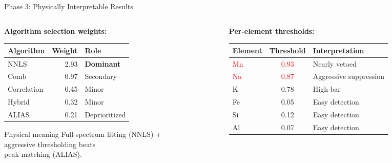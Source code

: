 \documentclass[aspectratio=169,12pt]{beamer}
\begin{document}
\begin{frame}{Phase 3: Physically Interpretable Results}
  \begin{columns}[T]
    \begin{column}{0.50\textwidth}
      \textbf{Algorithm selection weights:}
      {\small
      \begin{table}
        \begin{tabular}{@{}lrl@{}}
          \toprule
          Algorithm & Weight & Role \\
          \midrule
          \rowcolor{cbGreen!15}
          NNLS & \alert{2.93} & \textbf{Dominant} \\
          Comb & 0.97 & Secondary \\
          Correlation & 0.45 & Minor \\
          Hybrid & 0.32 & Minor \\
          ALIAS & 0.21 & Deprioritized \\
          \bottomrule
        \end{tabular}
      \end{table}
      }

      \vspace{0.3em}
      \begin{exampleblock}{Physical meaning}
        Full-spectrum fitting (NNLS) +\\
        aggressive thresholding beats\\
        peak-matching (ALIAS).
      \end{exampleblock}
    \end{column}
    \begin{column}{0.47\textwidth}
      \textbf{Per-element thresholds:}
      {\small
      \begin{table}
        \begin{tabular}{@{}lcl@{}}
          \toprule
          Element & Threshold & Interpretation \\
          \midrule
          \textcolor{red}{Mn} & \textcolor{red}{0.93} & Nearly vetoed \\
          \textcolor{red}{Na} & \textcolor{red}{0.87} & Aggressive suppression \\
          K & 0.78 & High bar \\
          \midrule
          Fe & \alert{0.05} & Easy detection \\
          Si & 0.12 & Easy detection \\
          Al & 0.07 & Easy detection \\
          \bottomrule
        \end{tabular}
      \end{table}
      }


\end{column}
\end{columns}
\end{frame}
\end{document}

